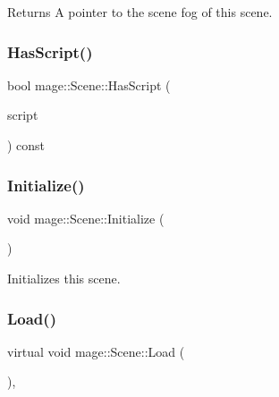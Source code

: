 \begin{DoxyReturn}{Returns}
A pointer to the scene fog of this scene. 
\end{DoxyReturn}
\hypertarget{classmage_1_1_scene_a9dd6c49e9db7590de1de4fbd128c78a9}{}\label{classmage_1_1_scene_a9dd6c49e9db7590de1de4fbd128c78a9} 
\subsubsection{\texorpdfstring{Has\+Script()}{HasScript()}}
{\footnotesize\ttfamily bool mage\+::\+Scene\+::\+Has\+Script (\begin{DoxyParamCaption}\item[{\hyperlink{namespacemage_a1e01ae66713838a7a67d30e44c67703e}{Shared\+Ptr}$<$ const \hyperlink{classmage_1_1_behavior_script}{Behavior\+Script} $>$}]{script }\end{DoxyParamCaption}) const}

\hypertarget{classmage_1_1_scene_a3cd12ef381ca743bf0b8f8aa2a76eb57}{}\label{classmage_1_1_scene_a3cd12ef381ca743bf0b8f8aa2a76eb57} 
\subsubsection{\texorpdfstring{Initialize()}{Initialize()}}
{\footnotesize\ttfamily void mage\+::\+Scene\+::\+Initialize (\begin{DoxyParamCaption}{ }\end{DoxyParamCaption})}

Initializes this scene. \hypertarget{classmage_1_1_scene_a1fb4a93eaa2f6a9e20594e205abb9a32}{}\label{classmage_1_1_scene_a1fb4a93eaa2f6a9e20594e205abb9a32} 
\subsubsection{\texorpdfstring{Load()}{Load()}}
{\footnotesize\ttfamily virtual void mage\+::\+Scene\+::\+Load (\begin{DoxyParamCaption}{ }\end{DoxyParamCaption})\hspace{0.3cm}{\ttfamily [private]}, {\ttfamily [virtual]}}

